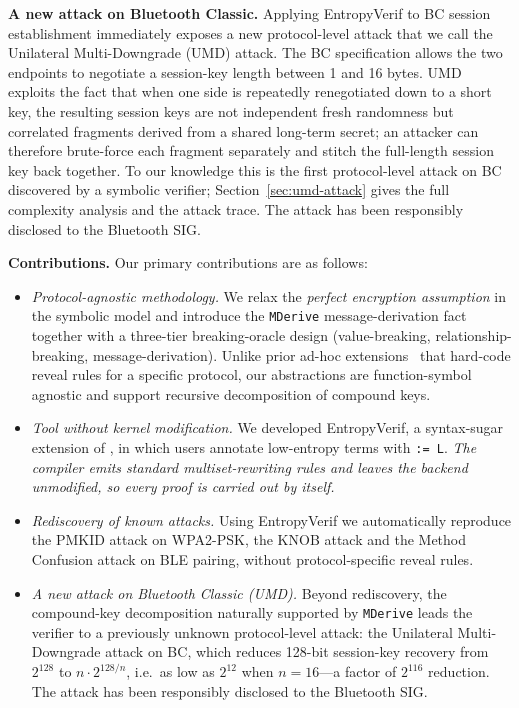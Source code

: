\smallskip
\noindent\textbf{A new attack on Bluetooth Classic.}
Applying EntropyVerif to BC session establishment immediately exposes a new protocol-level attack that we call the Unilateral Multi-Downgrade (UMD) attack.
The BC specification allows the two endpoints to negotiate a session-key length between 1 and 16 bytes.
UMD exploits the fact that when one side is repeatedly renegotiated down to a short key, the resulting session keys are not independent fresh randomness but correlated fragments derived from a shared long-term secret; an attacker can therefore brute-force each fragment separately and stitch the full-length session key back together.
To our knowledge this is the first protocol-level attack on BC discovered by a symbolic verifier; Section~\ref{sec:umd-attack} gives the full complexity analysis and the attack trace.
The attack has been responsibly disclosed to the Bluetooth SIG.

\noindent\textbf{Contributions.}
Our primary contributions are as follows:
\begin{itemize}[leftmargin=*]
    \item \emph{Protocol-agnostic methodology.} We relax the \emph{perfect encryption assumption} in the symbolic model and introduce the \texttt{MDerive} message-derivation fact together with a three-tier breaking-oracle design (value-breaking, relationship-breaking, message-derivation). Unlike prior ad-hoc extensions~\cite{shi2023blesc,claverie2023tamarin,jangid2023bluepe} that hard-code reveal rules for a specific protocol, our abstractions are function-symbol agnostic and support recursive decomposition of compound keys.
    \item \emph{Tool without kernel modification.} We developed EntropyVerif, a syntax-sugar extension of \Tamarin{}, in which users annotate low-entropy terms with \texttt{:= L}.
          \emph{The compiler emits standard multiset-rewriting rules and leaves the \Tamarin{}
          backend unmodified, so every proof is carried out by \Tamarin{} itself.}
    \item \emph{Rediscovery of known attacks.} Using EntropyVerif we automatically reproduce the PMKID attack on WPA2-PSK, the KNOB attack and the Method Confusion attack on BLE pairing, without protocol-specific reveal rules.
    \item \emph{A new attack on Bluetooth Classic (UMD).} Beyond rediscovery, the compound-key decomposition naturally supported by \texttt{MDerive} leads the verifier to a previously unknown protocol-level attack: the Unilateral Multi-Downgrade attack on BC, which reduces 128-bit session-key recovery from $2^{128}$ to $n \cdot 2^{128/n}$, i.e.\ as low as $2^{12}$ when $n = 16$---a factor of $2^{116}$ reduction. The attack has been responsibly disclosed to the Bluetooth SIG.
\end{itemize}

